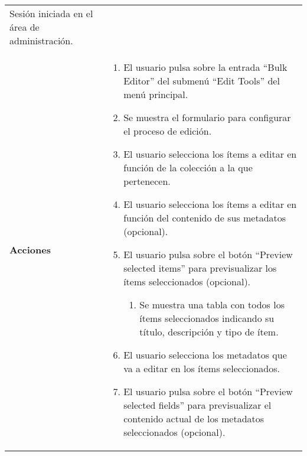 \begin{longtable}[]{@{}ll@{}}
\begin{minipage}[t]{0.79\columnwidth}
Sesión iniciada en el área de administración.\strut
\end{minipage}\tabularnewline
\begin{minipage}[t]{0.15\columnwidth}\raggedright
\textbf{Acciones}\strut
\end{minipage} & \begin{minipage}[t]{0.79\columnwidth}\raggedright
\begin{enumerate}
\def\labelenumi{\arabic{enumi}.}
\tightlist
\item
  El usuario pulsa sobre la entrada ``Bulk Editor'' del submenú ``Edit
  Tools'' del menú principal.
\item
  Se muestra el formulario para configurar el proceso de edición.
\item
  El usuario selecciona los ítems a editar en función de la colección a
  la que pertenecen.
\item
  El usuario selecciona los ítems a editar en función del contenido de
  sus metadatos (opcional).
\item
  El usuario pulsa sobre el botón ``Preview selected items'' para
  previsualizar los ítems seleccionados (opcional).

  \begin{enumerate}
  \def\labelenumii{\alph{enumii}.}
  \tightlist
  \item
    Se muestra una tabla con todos los ítems seleccionados indicando su
    título, descripción y tipo de ítem.
  \end{enumerate}
\item
  El usuario selecciona los metadatos que va a editar en los ítems
  seleccionados.
\item
  El usuario pulsa sobre el botón ``Preview selected fields'' para
  previsualizar el contenido actual de los metadatos seleccionados
  (opcional).


\end{enumerate}
\end{minipage}
\end{longtable}
